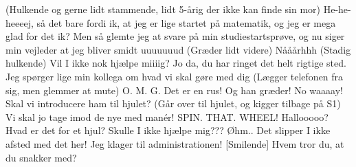 \documentclass[a4paper,11pt]{article}
\begin{document}
\begin{sketch}
 (Hulkende og gerne lidt stammende, lidt 5-årig der ikke kan finde sin mor) He-he-heeeej, så det bare fordi ik, at jeg er lige startet på matematik, og jeg er mega glad for det ik? Men så glemte jeg at svare på min studiestartsprøve, og nu siger min vejleder at jeg bliver smidt
uuuuuuud (Græder lidt videre)
 Nååårhhh
 (Stadig hulkende) Vil I ikke nok hjælpe miiiig?
 Jo da, du har ringet det helt rigtige sted. Jeg spørger lige min kollega
om hvad vi skal gøre med dig (Lægger telefonen fra sig, men glemmer
at mute)
 O. M. G. Det er en rus! Og han græder!
 No waaaay!
 Skal vi introducere ham til hjulet?
 (Går over til hjulet, og kigger tilbage på S1) Vi skal jo tage imod de nye
med manér!
 SPIN. THAT. WHEEL!
 Hallooooo? Hvad er det for et hjul? Skulle I ikke hjælpe mig???
 Øhm..
 Det slipper I ikke afsted med det her! Jeg klager til administrationen!
[Smilende] Hvem tror du, at du snakker med?



\end{sketch}
\end{document}
